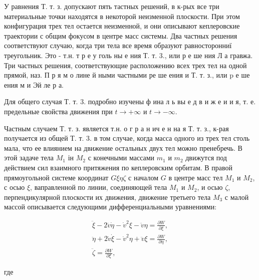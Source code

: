 \documentclass[10pt]{article}
\begin{document}
У равнения Т. т. з. допускают пять тастных решений, в к-рых все три материальные точки находятся в некоторой неизменной плоскости. При этом конфигурация трех тел остается неизменной, и они описывают кеплеровские траектории с общим фокусом в центре масс системы. Два частных решения соответствуют случаю, когда три тела все время образуют равносторонниї треугольник. Это - т.н. т р е у голь ны е ния Т. т. 3., или р е ше ния Л а гравжа. Три частных решения, соответствующие расположению всех трех тел на одной прямой, наз. П р я м о лине й ными частными ре ше ения и Т. т. з., или $\mathrm{p}$ е ше ения м и Эй ле р а.



Для общего случая Т. т. 3. подробно изучены ф ина л ь вы е д в и ж е и и я, т. е. предельные свойства движения при $t \rightarrow+\infty$ и $t \rightarrow-\infty$.



Частным случаем Т. т. з. является т.н. о г р а н ич е н на я Т. т. з., к-рая получается из общей Т. т. 3. в том случае, когда масса одного из трех тел столь мала, что ее влиянием на движение остальных двух тел можно пренебречь. В этой задаче тела $M_{1}$ ін $M_{2}$ с конечными массами $m_{1}$ и $m_{2}$ движутся под действием сил взаимного притяжения по кеплеровским орбитам. В правой прямоугольной системе координат $G \xi \eta \zeta$ с началом $G$ в центре масс тел $M_{1}$ и $M_{2}$, с осью $\xi$, ваправленной по линии, соединяющей тела $M_{1}$ и $M_{2}$, и осью $\zeta$, перпендикулярной плоскости их движения, движение третьего тела $M_{3}$ с малой массой описывается следующими дифференциальными уравнениями:



\[

\begin{gathered}

\ddot{\xi}-2 \ddot{v} \dot{\eta}-\dot{v}^{2} \xi-\ddot{v} \eta=\frac{\partial W}{\partial \xi}, \\

\ddot{\eta}+2 \dot{v} \dot{\xi}-\dot{v}^{2} \eta+\ddot{v} \xi=\frac{\partial W}{\partial \eta}, \\

\ddot{\zeta}=\frac{\partial W}{\partial \xi},

\end{gathered}

\]



где
\end{document}
